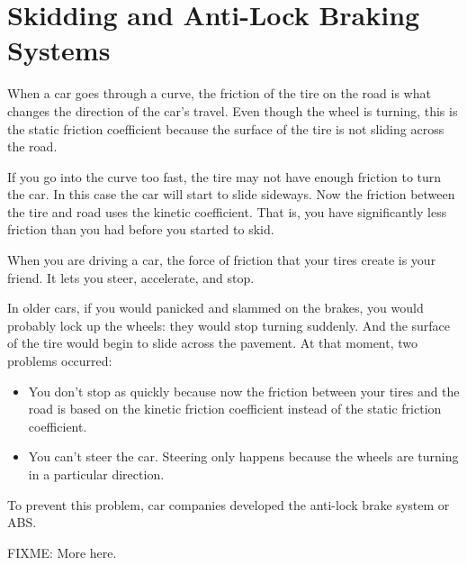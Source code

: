 \section{Skidding and Anti-Lock Braking Systems}

When a car goes through a curve,  the friction of the tire on the road is what changes the direction of the 
car's travel.  Even though the wheel is turning,   this is the static friction coefficient because the surface of the tire is not sliding across the road.

If you go into the curve too fast,  the tire may not have enough friction to turn the car.  In this case the car will start to slide sideways.  Now the friction between the tire and road uses the kinetic coefficient.  That is,   you have significantly less friction than you had before you started to skid.

When you are driving a car,  the force of friction that your tires create is your friend.  It lets you steer, accelerate, and stop.

In older cars,  if you would panicked  and slammed on the brakes,  you would probably lock up the wheels: they would stop turning suddenly.  And the surface of the tire would begin to slide across the pavement.  At that moment,  two problems occurred:
\begin{itemize}
\item You don't stop as quickly because now the friction between your tires and the road is based on the kinetic friction coefficient instead of the static friction coefficient.
\item You can't steer the car.  Steering only happens because the wheels are turning in a particular direction.
\end{itemize}

To prevent this problem,  car companies developed the anti-lock brake system or ABS.

FIXME: More here.





